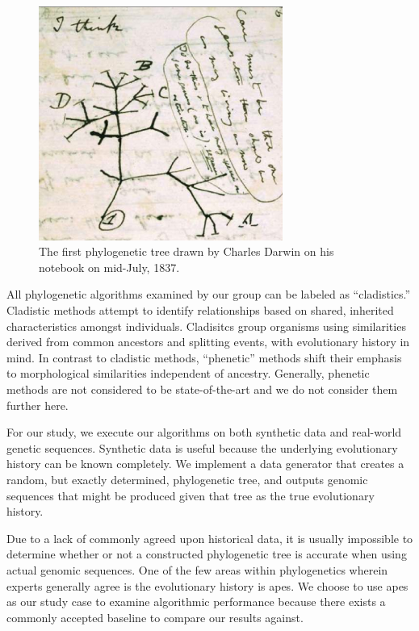 \documentclass[10pt,twocolumn]{article}
\begin{document}
\begin{figure}[ht!]
\centering
\includegraphics[width=80mm]{media/ithink.eps}
\caption{The first phylogenetic tree drawn by Charles Darwin on his notebook on mid-July, 1837.}
\label{darwintree}
\end{figure}

All phylogenetic algorithms examined by our group can be labeled as ``cladistics.'' Cladistic methods attempt to identify relationships based on shared, inherited characteristics amongst individuals. Cladisitcs group organisms using similarities derived from common ancestors and splitting events, with evolutionary history in mind. In contrast to cladistic methods, ``phenetic'' methods shift their emphasis to morphological similarities independent of ancestry. Generally, phenetic methods are not considered to be state-of-the-art and we do not consider them further here.

For our study, we execute our algorithms on both synthetic data and real-world genetic sequences. Synthetic data is useful because the underlying evolutionary history can be known completely. We implement a data generator that creates a random, but exactly determined, phylogenetic tree, and outputs genomic sequences that might be produced given that tree as the true evolutionary history.

Due to a lack of commonly agreed upon historical data, it is usually impossible to determine whether or not a constructed phylogenetic tree is accurate when using actual genomic sequences. One of the few areas within phylogenetics wherein experts generally agree is the evolutionary history is apes. We choose to use apes as our study case to examine algorithmic performance because there exists a commonly accepted baseline to compare our results against.
\end{document}
